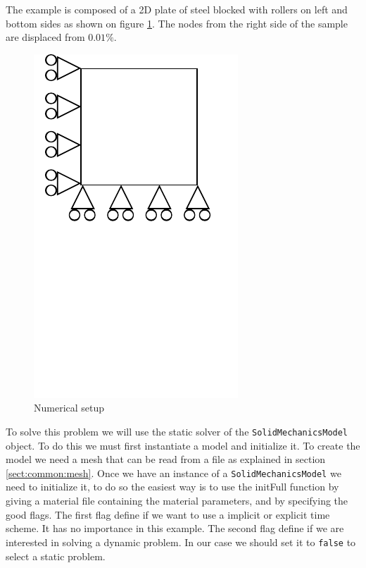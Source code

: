 \documentclass[a4paper,11pt]{book}
\newcommand{\code}[1]{{\tt{#1}}}
\begin{document}
The example is composed of a 2D  plate of steel blocked with rollers on left
and bottom sides as shown on figure \ref{fig:smm:static}. The nodes from
the right side  of the sample are  displaced from $0.01\%$.

\begin{figure}[!htb]
  \centering
  \includegraphics{figures/implicit_static}
  \caption{Numerical setup\label{fig:smm:static}}
\end{figure}

To   solve   this   problem   we   will   use   the   static   solver   of   the
\code{SolidMechanicsModel} object. To do this we must
first instantiate a model and initialize it.  To create the model we need a mesh
that    can    be   read    from    a    file    as   explained    in    section
\ref{sect:common:mesh}. Once we have an instance of a \code{SolidMechanicsModel}
we  need  to  initialize   it,  to  do  so  the  easiest  way   is  to  use  the
initFull function by  giving a material file
containing the material parameters, and  by specifying the good flags. The first
flag define  if we want to  use a implicit or  explicit time scheme.   It has no
importance  in this  example. The  second flag  define if  we are  interested in
solving  a dynamic problem.  In our  case we  should set  it to  \code{false} to
select a static problem.
\end{document}
